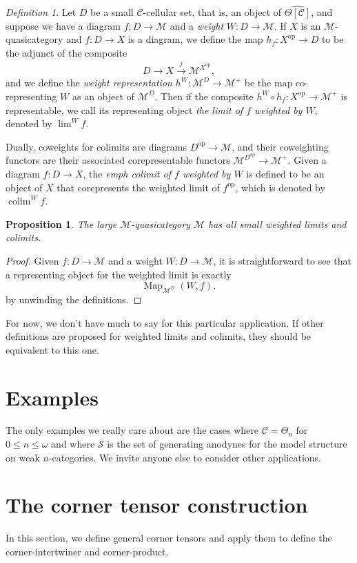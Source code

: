 \documentclass{amsart}
\numberwithin{equation}{section}
\theoremstyle{plain}   %
\newtheorem{prop}[subsection]{Proposition}
\theoremstyle{remark}
\newtheorem{defn}[subsection]{Definition}
\theoremstyle{plain}
\DeclareMathOperator{\colim}{colim}
\DeclareMathOperator{\limw}{lim}
\newcommand{\op}{\ensuremath{\mathrm{op}}}
\DeclareMathOperator{\Map}{Map}
\newcommand{\C}{\ensuremath{\mathcal{C}}}
\newcommand{\M}{\ensuremath{\mathcal{M}}}
\newcommand{\setS}{\ensuremath{\mathscr{S}}}
\newcommand{\cellset}{\ensuremath{\widehat{\Theta[\mathcal{C}]}}}
\begin{document}
\begin{defn}
	Let \(D\) be a small \(\C\)-cellular set, that is, an object of \(\cellset\), and suppose we have a diagram \(f:D\to \M\) and a \emph{weight} \(W:D\to \M\).  If \(X\) is an \(\M\)-quasicategory and \(f:D\to X\) is a diagram, we define the map \(h_f: X^\op \to D\) to be the adjunct of the composite \[D\to X\xrightarrow{j} \M^{X^\op},\] and we define the \emph{weight representation} \(h^W:\M^D \to \M^+\) be the map co-representing \(W\) as an object of \(\M^D\).  Then if the composite \(h^W\circ h_f:X^\op \to \M^+\) is representable, we call its representing object \emph{the limit of \(f\) weighted by \(W\)}, denoted  by \(\limw^W f\).

	Dually, coweights for colimits are diagrams \(D^\op \to \M\), and their coweighting functors are their associated corepresentable functors \(\M^{D^\op}\to \M^+\).  Given a diagram \(f:D\to X\), the \emph{emph colimit of \(f\) weighted by \(W\)} is defined to be an object of \(X\) that corepresents the weighted limit of \(f^\op\), which is denoted by \(\colim^W f\).  
\end{defn}

\begin{prop} The large \(\M\)-quasicategory \(\M\) has all small weighted limits and colimits.
\end{prop}
\begin{proof}  Given \(f:D\to \M\) and a weight \(W:D\to \M\), it is straightforward to see that a representing object for the weighted limit is exactly \[\Map_{\M^D}(W,f),\] by unwinding the definitions.
\end{proof}

For now, we don't have much to say for this particular application.  If other definitions are proposed for weighted limits and colimits, they should be equivalent to this one.  

\section{Examples}
The only examples we really care about are the cases where \(\C=\Theta_n\) for \(0\leq n\leq \omega\) and where \(\setS\) is the set of generating anodynes for the model structure on weak \(n\)-categories.  We invite anyone else to consider other applications.

\appendix
\section{The corner tensor construction}\label{cornertensor} In this section, we define general corner tensors and apply them to define the corner-intertwiner and corner-product.
\end{document}

